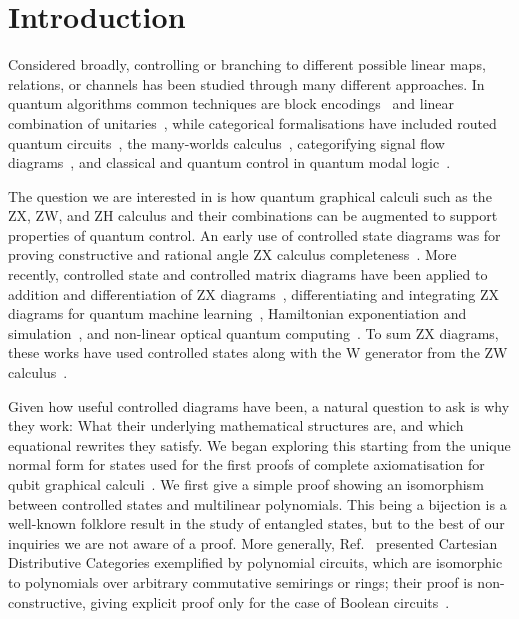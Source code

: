 \section{Introduction}
Considered broadly, controlling or branching to different possible linear maps, relations, or channels has been studied through many different approaches. In quantum algorithms common techniques are block encodings~\cite{gilyen2019qsvt, rall2020qalgsblockenc} and linear combination of unitaries~\cite{childs2012hamsimlcu}, while categorical formalisations have included routed quantum circuits~\cite{vanrietvelde2021routed}, the many-worlds calculus~\cite{chardonnet2023manyworlds}, categorifying signal flow diagrams~\cite{baez2015categoriesctrl}, and classical and quantum control in quantum modal logic~\cite{sati2023quantummonadology}.

The question we are interested in is how quantum graphical calculi such as the ZX, ZW, and ZH calculus and their combinations can be augmented to support properties of quantum control.
An early use of controlled state diagrams was for proving constructive and rational angle ZX calculus completeness~\cite{jeandel2018zxconstructive}. More recently, controlled state and controlled matrix diagrams have been applied to addition and differentiation of ZX diagrams~\cite{jeandel2024adddiffzx}, differentiating and integrating ZX diagrams for quantum machine learning~\cite{wang2022diffintzx}, Hamiltonian exponentiation and simulation~\cite{shaikh2022sum}, and non-linear optical quantum computing~\cite{de2023light}. To sum ZX diagrams, these works have used controlled states along with the W generator from the ZW calculus~\cite{coecke2010zw}.

Given how useful controlled diagrams have been, a natural question to ask is why they work: What their underlying mathematical structures are, and which equational rewrites they satisfy.
We began exploring this starting from the unique normal form for states used for the first proofs of complete axiomatisation for qubit graphical calculi~\cite{hadzihasanovic2017thesis, Hadzihasanovic2018zwzxcomplete}.
We first give a simple proof showing an isomorphism between controlled states and multilinear polynomials. This being a bijection is a well-known folklore result in the study of entangled states, but to the best of our inquiries we are not aware of a proof. More generally, Ref.~\cite{wilson2023diffpolycirc} presented Cartesian Distributive Categories exemplified by polynomial circuits, which are isomorphic to polynomials over arbitrary commutative semirings or rings; their proof is non-constructive, giving explicit proof only for the case of Boolean circuits~\cite{wilson2021revderbool}.


